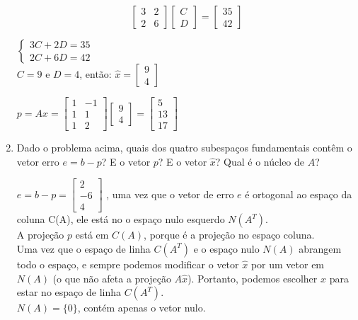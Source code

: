 \documentclass[leqno]{article}
\numberwithin{equation}{section}
\begin{document}
\begin{enumerate}
\begin{sol}
		$$\begin{bmatrix}
			3 & 2\\
			2 & 6
		\end{bmatrix}\begin{bmatrix}
		C \\
		D
		\end{bmatrix} = \begin{bmatrix}
		35\\
		42
		\end{bmatrix}$$
	
		$
		\left\{
		\begin {array}{cl}
		3C + 2D = 35\\
		2C + 6D = 42
		\end{array}
		\right.
		$\\
		
		$C = 9$ e $D = 4$, então: $\hat{x} = \begin{bmatrix}
			9\\
			4
		\end{bmatrix}$
	
		$p = A\hat{x} = \begin{bmatrix}
			1 & -1 \\
			1 & 1 \\
			1 & 2
		\end{bmatrix}\begin{bmatrix}
		9\\
		4
		\end{bmatrix} = \begin{bmatrix}
		5\\
		13\\
		17
		\end{bmatrix}$
		\end{sol}
		
		
		\item Dado o problema acima, quais dos quatro subespaços fundamentais contêm o vetor erro $e = b - p$? E o vetor $p$? E o vetor $\hat{x}$? Qual é o núcleo de $A$?
		
		\begin{sol}
			$e = b - p =\begin{bmatrix}
				2 \\
				-6 \\
				4
			\end{bmatrix}$
			, uma vez que o vetor de erro $e$ é ortogonal ao espaço da coluna C(A), ele está no
			o espaço nulo esquerdo $N(A^T)$.\\
			A projeção $p$ está em $C(A)$, porque é a projeção no espaço coluna.\\
			Uma vez que o espaço de linha $C(A^T)$ e o espaço nulo $N(A)$ abrangem todo o espaço, e
			sempre podemos modificar o vetor $\hat{x}$ por um vetor em $N(A)$ (o que não afeta a
			projeção $A\hat{x}$). Portanto, podemos escolher $\hat{x}$ para estar no espaço de linha $C(A^T)$.\\
			$N(A) = \{0\}$, contém apenas o vetor nulo.
			

\end{sol}
\end{enumerate}
\end{document}
